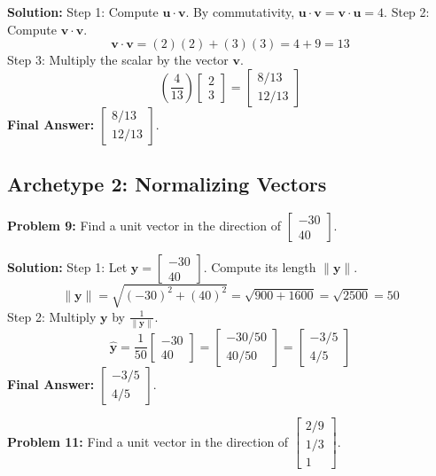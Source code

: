 \documentclass[11pt, letterpaper]{article}
\theoremstyle{definition}
\theoremstyle{remark}
\begin{document}
\textbf{Solution:}
Step 1: Compute $\mathbf{u} \cdot \mathbf{v}$. By commutativity, $\mathbf{u} \cdot \mathbf{v} = \mathbf{v} \cdot \mathbf{u} = 4$.
Step 2: Compute $\mathbf{v} \cdot \mathbf{v}$.
\[ \mathbf{v} \cdot \mathbf{v} = (2)(2) + (3)(3) = 4 + 9 = 13 \]
Step 3: Multiply the scalar by the vector $\mathbf{v}$.
\[ \left( \frac{4}{13} \right) \begin{bmatrix} 2 \\ 3 \end{bmatrix} = \begin{bmatrix} 8/13 \\ 12/13 \end{bmatrix} \]
\textbf{Final Answer:} $\begin{bmatrix} 8/13 \\ 12/13 \end{bmatrix}$.

\subsection{Archetype 2: Normalizing Vectors}

\textbf{Problem 9:} Find a unit vector in the direction of $\begin{bmatrix} -30 \\ 40 \end{bmatrix}$.

\textbf{Solution:}
Step 1: Let $\mathbf{y} = \begin{bmatrix} -30 \\ 40 \end{bmatrix}$. Compute its length $\|\mathbf{y}\|$.
\[ \|\mathbf{y}\| = \sqrt{(-30)^2 + (40)^2} = \sqrt{900 + 1600} = \sqrt{2500} = 50 \]
Step 2: Multiply $\mathbf{y}$ by $\frac{1}{\|\mathbf{y}\|}$.
\[ \mathbf{\hat{y}} = \frac{1}{50} \begin{bmatrix} -30 \\ 40 \end{bmatrix} = \begin{bmatrix} -30/50 \\ 40/50 \end{bmatrix} = \begin{bmatrix} -3/5 \\ 4/5 \end{bmatrix} \]
\textbf{Final Answer:} $\begin{bmatrix} -3/5 \\ 4/5 \end{bmatrix}$.

\vspace{1em}
\textbf{Problem 11:} Find a unit vector in the direction of $\begin{bmatrix} 2/9 \\ 1/3 \\ 1 \end{bmatrix}$.
\end{document}
